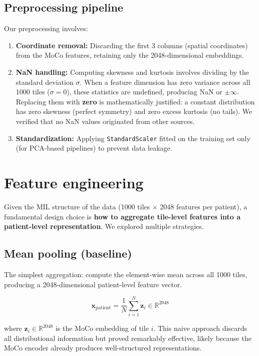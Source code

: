\documentclass[11pt,a4paper]{article}
\begin{document}
\subsection{Preprocessing pipeline}

Our preprocessing involves:
\begin{enumerate}[nosep]
    \item \textbf{Coordinate removal:} Discarding the first 3 columns (spatial coordinates) from the MoCo features, retaining only the 2048-dimensional embeddings.
    \item \textbf{NaN handling:} Computing skewness and kurtosis involves dividing by the standard deviation $\sigma$. When a feature dimension has zero variance across all 1000 tiles ($\sigma = 0$), these statistics are undefined, producing NaN or $\pm\infty$. Replacing them with \textbf{zero} is mathematically justified: a constant distribution has zero skewness (perfect symmetry) and zero excess kurtosis (no tails). We verified that no NaN values originated from other sources.
    \item \textbf{Standardization:} Applying \texttt{StandardScaler} fitted on the training set only (for PCA-based pipelines) to prevent data leakage.
\end{enumerate}

\newpage
\section{Feature engineering}
\label{sec:features}

Given the MIL structure of the data (1000 tiles $\times$ 2048 features per patient), a fundamental design choice is \textbf{how to aggregate tile-level features into a patient-level representation}. We explored multiple strategies.

\subsection{Mean pooling (baseline)}
The simplest aggregation: compute the element-wise mean across all 1000 tiles, producing a 2048-dimensional patient-level feature vector.

\begin{equation}
    \mathbf{x}_{\text{patient}} = \frac{1}{N} \sum_{i=1}^{N} \mathbf{z}_i \in \mathbb{R}^{2048}
\end{equation}

where $\mathbf{z}_i \in \mathbb{R}^{2048}$ is the MoCo embedding of tile $i$. This naive approach discards all distributional information but proved remarkably effective, likely because the MoCo encoder already produces well-structured representations.
\end{document}

